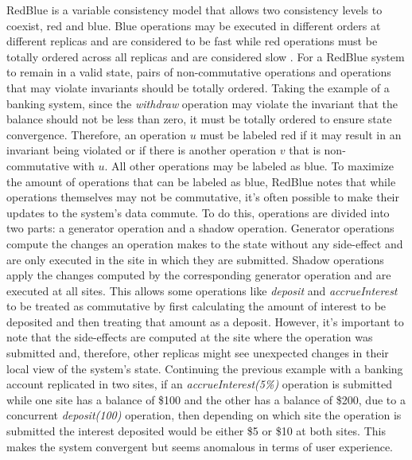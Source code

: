 RedBlue is a variable consistency model that allows two consistency levels to coexist, red and blue. Blue operations may be executed in different orders at different replicas and are considered to be fast while red operations must be totally ordered across all replicas and are considered slow \cite{Li2012}. For a RedBlue system to remain in a valid state, pairs of non-commutative operations and operations that may violate invariants should be totally ordered. Taking the example of a banking system, since the \textit{withdraw} operation may violate the invariant that the balance should not be less than zero, it must be totally ordered to ensure state convergence. Therefore, an operation $u$ must be labeled red if it may result in an invariant being violated or if there is another operation $v$ that is non-commutative with $u$. All other operations may be labeled as blue. To maximize the amount of operations that can be labeled as blue, RedBlue notes that while operations themselves may not be commutative, it's often possible to make their updates to the system's data commute. To do this, operations are divided into two parts: a generator operation and a shadow operation. Generator operations compute the changes an operation makes to the state without any side-effect and are only executed in the site in which they are submitted. Shadow operations apply the changes computed by the corresponding generator operation and are executed at all sites. This allows some operations like \textit{deposit} and \textit{accrueInterest} to be treated as commutative by first calculating the amount of interest to be deposited and then treating that amount as a deposit.  However, it's important to note that the side-effects are computed at the site where the operation was submitted and, therefore, other replicas might see unexpected changes in their local view of the system's state. Continuing the previous example with a banking account replicated in two sites, if an \textit{accrueInterest(5\%)} operation is submitted while one site has a balance of \$100 and the other has a balance of \$200, due to a concurrent \textit{deposit(100)} operation, then depending on which site the operation is submitted the interest deposited would be either \$5 or \$10 at both sites. This makes the system convergent but seems anomalous in terms of user experience.\par
